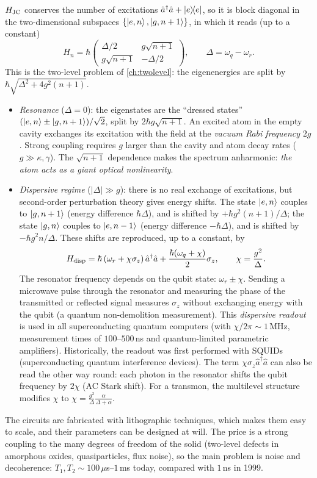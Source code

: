 $H_{\rm JC}$ conserves the number of excitations $\hat a^\dagger\hat a+\left|e\middle\rangle\!\middle\langle e\right|$, so it is block diagonal in the two-dimensional subspaces $\{\left|e,n\right\rangle,\left|g,n+1\right\rangle\}$, in which it reads (up to a constant)
\begin{equation}
  H_n=\hbar\begin{pmatrix}\Delta/2&g\sqrt{n+1}\\g\sqrt{n+1}&-\Delta/2\end{pmatrix},\qquad\Delta=\omega_q-\omega_r.
\end{equation}
This is the two-level problem of \cref{ch:twolevel}: the eigenenergies are split by $\hbar\sqrt{\Delta^2+4g^2(n+1)}$.
\begin{itemize}
  \item \emph{Resonance} ($\Delta=0$): the eigenstates are the ``dressed states'' $(\left|e,n\right\rangle\pm\left|g,n+1\right\rangle)/\sqrt2$, split by $2\hbar g\sqrt{n+1}$. An excited atom in the empty cavity exchanges its excitation with the field at the
  \emph{vacuum Rabi frequency} $2g$. Strong coupling requires $g$ larger than the cavity and atom decay rates ($g\gg\kappa,\gamma$). The $\sqrt{n+1}$ dependence makes the spectrum anharmonic: \emph{the atom acts as a giant optical nonlinearity}.
  \item \emph{Dispersive regime} ($|\Delta|\gg g$): there is no real exchange of excitations, but second-order perturbation theory gives energy shifts. The state $\left|e,n\right\rangle$ couples to $\left|g,n+1\right\rangle$ (energy difference $\hbar\Delta$), and is shifted
  by $+\hbar g^2(n+1)/\Delta$; the state $\left|g,n\right\rangle$ couples to $\left|e,n-1\right\rangle$ (energy difference $-\hbar\Delta$), and is shifted by $-\hbar g^2n/\Delta$. These shifts are reproduced, up to a constant, by
  \begin{equation}\label{eq:dispersive}
    H_{\rm disp}=\hbar\left(\omega_r+\chi\sigma_z\right)\hat a^\dagger\hat a+\frac{\hbar(\omega_q+\chi)}2\sigma_z,\qquad\chi=\frac{g^2}\Delta .
  \end{equation}
  The resonator frequency depends on the qubit state: $\omega_r\pm\chi$. Sending a microwave pulse through the resonator and measuring the phase of the transmitted or reflected signal measures $\sigma_z$ without exchanging energy with the qubit (a
  quantum non-demolition measurement). This \emph{dispersive readout} is used in all superconducting quantum computers (with $\chi/2\pi\sim1$\,MHz, measurement times of $100$--$500$\,ns and quantum-limited parametric amplifiers). Historically,
  the readout was first performed with SQUIDs (superconducting quantum interference devices). The term $\chi\sigma_z\hat a^\dagger\hat a$ can also be read the other way round: each photon in the resonator shifts the qubit frequency by $2\chi$ (AC Stark shift).
  For a transmon, the multilevel structure modifies $\chi$ to $\chi=\frac{g^2}{\Delta}\frac{\alpha}{\Delta+\alpha}$.
\end{itemize}
The circuits are fabricated with lithographic techniques, which makes them easy to scale, and their parameters can be designed at will. The price is a strong coupling to the many degrees of freedom of the solid (two-level defects in amorphous oxides,
quasiparticles, flux noise), so the main problem is noise and decoherence: $T_1,T_2\sim100\,\mu$s--$1$\,ms today, compared with $1$\,ns in 1999.

